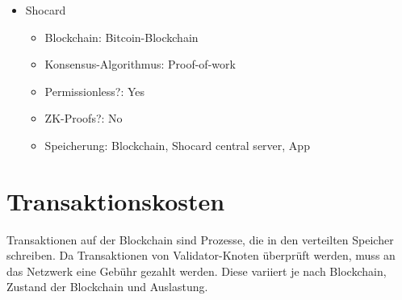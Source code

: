 \begin{itemize}
	\item Shocard
	\begin{itemize}
		\item Blockchain: Bitcoin-Blockchain
		\item Konsensus-Algorithmus: Proof-of-work
		\item Permissionless?: Yes
		\item ZK-Proofs?: No
		\item Speicherung: Blockchain, Shocard central server, App
	\end{itemize}
\end{itemize}



\section{Transaktionskosten}
Transaktionen auf der Blockchain sind Prozesse, die in den verteilten Speicher schreiben. Da Transaktionen von Validator-Knoten überprüft werden, muss an das Netzwerk eine Gebühr gezahlt werden. Diese variiert je nach Blockchain, Zustand der Blockchain und Auslastung.
